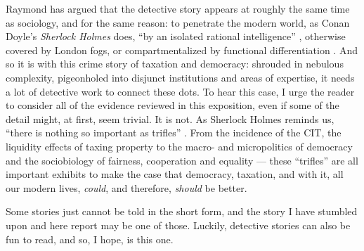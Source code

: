 Raymond \citeauthor{Williams1992} has argued that the detective story appears at roughly the same time as sociology, and for the same reason: to penetrate the modern world, as Conan Doyle's \emph{Sherlock Holmes} does, ``by an isolated rational intelligence'' \citep[88]{Williams1992}, otherwise covered by London fogs, or compartmentalized by functional differentiation \citep{Durkheim-1893-aa}. 
And so it is with this crime story of taxation and democracy: shrouded in nebulous complexity, pigeonholed into disjunct institutions and areas of expertise, it needs a lot of detective work to connect these dots. 
To hear this case, I urge the reader to consider all of the evidence reviewed in this exposition, even if some of the detail might, at first, seem trivial. 
It is not. 
As Sherlock Holmes reminds us, ``there is nothing so important as trifles'' \citep[238]{Doyle1891}. 
From the incidence of the \gls{CIT}, the liquidity effects of taxing property to the macro- and micropolitics of democracy and the sociobiology of fairness, cooperation and equality %
--- these ``trifles'' are all important exhibits to make the case that democracy, taxation, and with it, all our modern lives, \emph{could}, and therefore, \emph{should} be better.

Some stories just cannot be told in the short form, and the story I have stumbled upon and here report may be one of those. %
Luckily, detective stories can also be fun to read, and so, I hope, is this one.